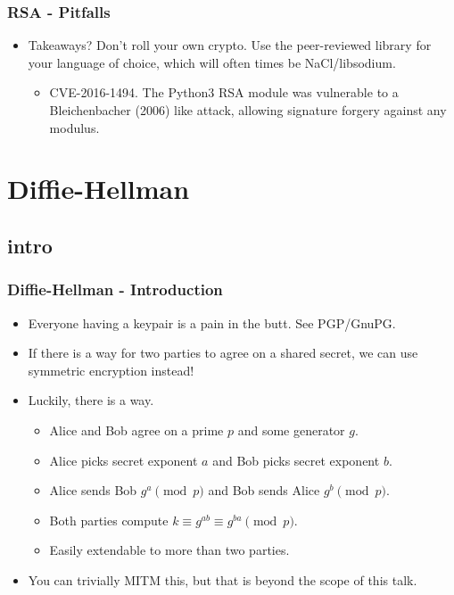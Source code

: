 \documentclass[aspectratio=169,t]{beamer}
\begin{document}
\begin{frame}
\frametitle{RSA - Pitfalls}
\begin{itemize}
\item
Takeaways? Don't roll your own crypto. Use the peer-reviewed library for your
language of choice, which will often times be NaCl/libsodium. \pause
\begin{itemize}
\item
CVE-2016-1494. The Python3 RSA module was vulnerable to a Bleichenbacher (2006)
like attack, allowing signature forgery against any modulus.
\end{itemize}
\end{itemize}
\end{frame}

\section{Diffie-Hellman}

\subsection{intro}
\begin{frame}
\frametitle{Diffie-Hellman - Introduction}
\begin{itemize}
\item
Everyone having a keypair is a pain in the butt. See PGP/GnuPG. \pause
\item
If there is a way for two parties to agree on a shared secret, we can use
symmetric encryption instead! \pause
\item
Luckily, there is a way. \pause
\begin{itemize}
\item
Alice and Bob agree on a prime $p$ and some generator $g$.
\item
Alice picks secret exponent $a$ and Bob picks secret exponent $b$.
\item
Alice sends Bob $g^a \pmod{p}$ and Bob sends Alice $g^b \pmod{p}$.
\item
Both parties compute $k \equiv g^{ab} \equiv g^{ba} \pmod{p}$.
\item
Easily extendable to more than two parties.
\end{itemize}
\pause
\item
You can trivially MITM this, but that is beyond the scope of this talk.
\end{itemize}
\end{frame}
\end{document}
